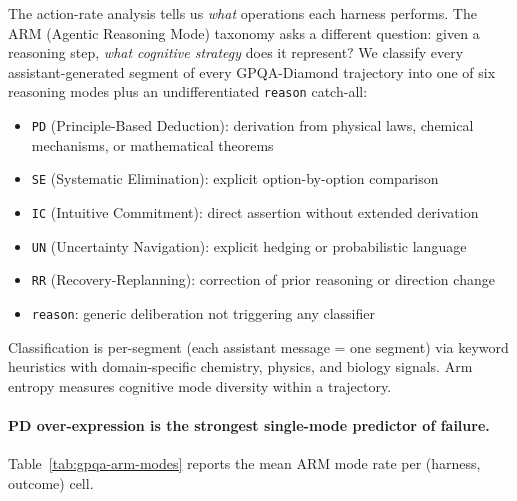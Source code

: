 The action-rate analysis tells us \emph{what} operations each harness performs.
The ARM (Agentic Reasoning Mode) taxonomy asks a different question: given a
reasoning step, \emph{what cognitive strategy} does it represent?
We classify every assistant-generated segment of every GPQA-Diamond trajectory
into one of six reasoning modes plus an undifferentiated \texttt{reason}
catch-all:

\begin{itemize}[leftmargin=*, itemsep=1pt]
\item \texttt{PD} (Principle-Based Deduction): derivation from physical laws,
  chemical mechanisms, or mathematical theorems
\item \texttt{SE} (Systematic Elimination): explicit option-by-option comparison
\item \texttt{IC} (Intuitive Commitment): direct assertion without extended
  derivation
\item \texttt{UN} (Uncertainty Navigation): explicit hedging or probabilistic
  language
\item \texttt{RR} (Recovery-Replanning): correction of prior reasoning or
  direction change
\item \texttt{reason}: generic deliberation not triggering any classifier
\end{itemize}

Classification is per-segment (each assistant message = one segment) via
keyword heuristics with domain-specific chemistry, physics, and biology signals.
Arm entropy measures cognitive mode diversity within a trajectory.

\paragraph{PD over-expression is the strongest single-mode predictor of failure.}

Table~\ref{tab:gpqa-arm-modes} reports the mean ARM mode rate per
(harness, outcome) cell.

